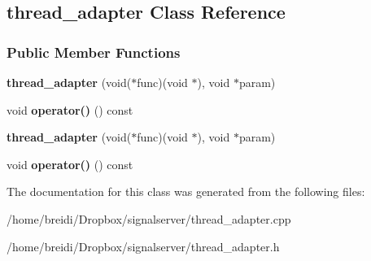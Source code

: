 \hypertarget{classthread__adapter}{
\subsection{thread\_\-adapter Class Reference}
\label{classthread__adapter}
}
\subsubsection*{Public Member Functions}
\begin{DoxyCompactItemize}
\item 
\hypertarget{classthread__adapter_ac28f39b688740bd3ebac7fb4892d60f5}{
{\bfseries thread\_\-adapter} (void($\ast$func)(void $\ast$), void $\ast$param)}
\label{classthread__adapter_ac28f39b688740bd3ebac7fb4892d60f5}

\item 
\hypertarget{classthread__adapter_ab47be646458ce9543a74de008893ed3c}{
void {\bfseries operator()} () const }
\label{classthread__adapter_ab47be646458ce9543a74de008893ed3c}

\item 
\hypertarget{classthread__adapter_ac28f39b688740bd3ebac7fb4892d60f5}{
{\bfseries thread\_\-adapter} (void($\ast$func)(void $\ast$), void $\ast$param)}
\label{classthread__adapter_ac28f39b688740bd3ebac7fb4892d60f5}

\item 
\hypertarget{classthread__adapter_ab47be646458ce9543a74de008893ed3c}{
void {\bfseries operator()} () const }
\label{classthread__adapter_ab47be646458ce9543a74de008893ed3c}

\end{DoxyCompactItemize}


The documentation for this class was generated from the following files:\begin{DoxyCompactItemize}
\item 
/home/breidi/Dropbox/signalserver/thread\_\-adapter.cpp\item 
/home/breidi/Dropbox/signalserver/thread\_\-adapter.h\end{DoxyCompactItemize}
